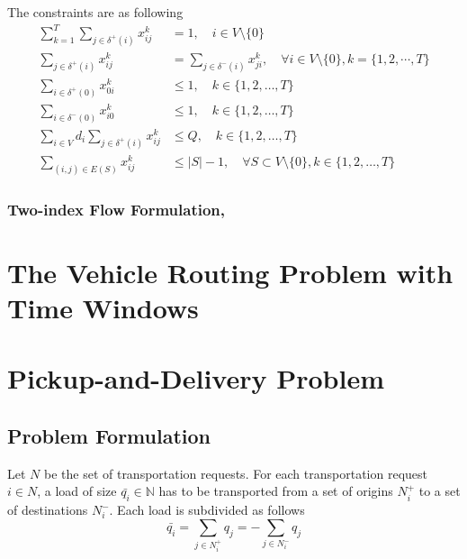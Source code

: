 					The constraints are as following
					\begin{align}
						\sum_{k = 1}^T \sum_{j \in \delta^+(i)} x_{ij}^k &= 1, \quad i \in V \setminus \{0\} \label{VRP:con:GoldenArcAssign}\\
						\sum_{j \in \delta^+(i)} x_{ij}^k &= \sum_{j \in \delta^-(i)} x_{ji}^k, \quad \forall i \in V \setminus \{0\}, k = \{1, 2, \cdots, T\} \label{VRP:con:GoldenBalance} \\
						\sum_{i \in \delta^+(0)} x_{0i}^k &\le 1, \quad k \in \{1, 2, \ldots, T\} \label{VRP:con:GoldenLeaveDepot} \\
						\sum_{i \in \delta^-(0)} x_{i0}^k &\le 1, \quad k \in \{1, 2, \ldots, T\} \label{VRP:con:GoldenReturnDepot} \\
						\sum_{i \in V} d_i \sum_{j \in \delta^+(i)} x_{ij}^k &\le Q, \quad k \in \{1, 2, \ldots, T\} \label{VRP:con:GoldenCap}\\
						\sum_{(i, j)\in E(S)} x_{ij}^k &\le |S| - 1, \quad \forall S\subset V\setminus \{0\}, k \in \{1, 2, \ldots, T\} \label{VRP:con:GoldenSubtour}
					\end{align}

				\subsection{Two-index Flow Formulation, }

		\chapter{The Vehicle Routing Problem with Time Windows}

		\chapter{Pickup-and-Delivery Problem}\label{chp:PDP}
			\section{Problem Formulation}
				Let $N$ be the set of transportation requests. For each transportation request $i \in N$, a load of size $\bar{q_i} \in \mathbb{N}$ has to be transported from a set of origins $N_i^+$ to a set of destinations $N_i^-$. Each load is subdivided as follows
				\begin{equation}
					\bar{q_i} = \sum_{j \in N_i^+} q_j = -\sum_{j \in N_i^-} q_j
				\end{equation}

